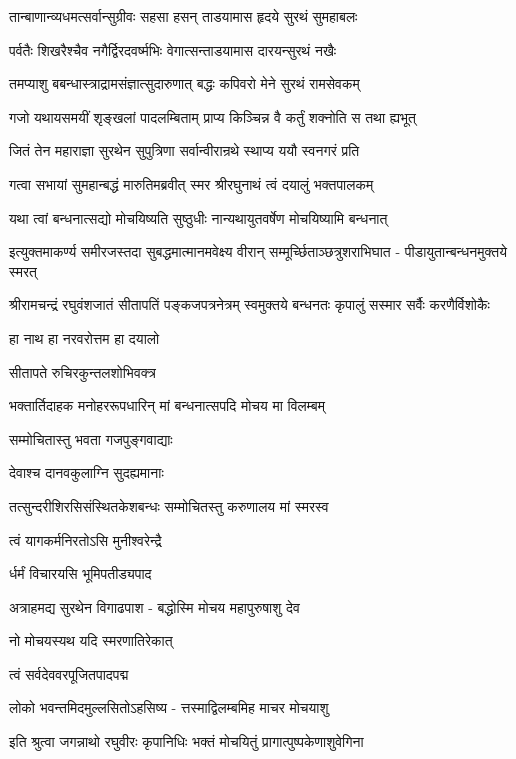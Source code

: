 \twolineshloka
{तान्बाणान्व्यधमत्सर्वान्सुग्रीवः सहसा हसन्}
{ताडयामास हृदये सुरथं सुमहाबलः}%

\twolineshloka
{पर्वतैः शिखरैश्चैव नगैर्द्विरदवर्ष्मभिः}
{वेगात्सन्ताडयामास दारयन्सुरथं नखैः}%

\twolineshloka
{तमप्याशु बबन्धास्त्राद्रामसंज्ञात्सुदारुणात्}
{बद्धः कपिवरो मेने सुरथं रामसेवकम्}%

\twolineshloka
{गजो यथायसमयीं शृङ्खलां पादलम्बिताम्}
{प्राप्य किञ्चिन्न वै कर्तुं शक्नोति स तथा ह्यभूत्}%

\twolineshloka
{जितं तेन महाराज्ञा सुरथेन सुपुत्रिणा}
{सर्वान्वीरान्रथे स्थाप्य ययौ स्वनगरं प्रति}%

\twolineshloka
{गत्वा सभायां सुमहान्बद्धं मारुतिमब्रवीत्}
{स्मर श्रीरघुनाथं त्वं दयालुं भक्तपालकम्}%

\twolineshloka
{यथा त्वां बन्धनात्सद्यो मोचयिष्यति सुष्ठुधीः}
{नान्यथायुतवर्षेण मोचयिष्यामि बन्धनात्}%

\fourlineindentedshloka
{इत्युक्तमाकर्ण्य समीरजस्तदा}
{सुबद्धमात्मानमवेक्ष्य वीरान्}
{सम्मूर्च्छिताञ्छत्रुशराभिघात -}
{पीडायुतान्बन्धनमुक्तये स्मरत्}%

\twolineshloka
{श्रीरामचन्द्रं रघुवंशजातं सीतापतिं पङ्कजपत्रनेत्रम्}
{स्वमुक्तये बन्धनतः कृपालुं सस्मार सर्वैः करणैर्विशोकैः}%


हा नाथ हा नरवरोत्तम हा दयालो

सीतापते रुचिरकुन्तलशोभिवक्त्र

\twolineshloka
{भक्तार्तिदाहक मनोहररूपधारिन्}
{मां बन्धनात्सपदि मोचय मा विलम्बम्}%

सम्मोचितास्तु भवता गजपुङ्गवाद्याः

देवाश्च दानवकुलाग्नि सुदह्यमानाः

\twolineshloka
{तत्सुन्दरीशिरसिसंस्थितकेशबन्धः}
{सम्मोचितस्तु करुणालय मां स्मरस्व}%

त्वं यागकर्मनिरतोऽसि मुनीश्वरेन्द्रै

र्धर्मं विचारयसि भूमिपतीड्यपाद

\twolineshloka
{अत्राहमद्य सुरथेन विगाढपाश -}
{बद्धोस्मि मोचय महापुरुषाशु देव}%

नो मोचयस्यथ यदि स्मरणातिरेकात्

त्वं सर्वदेववरपूजितपादपद्म

\twolineshloka
{लोको भवन्तमिदमुल्लसितोऽहसिष्य -}
{त्तस्माद्विलम्बमिह माचर मोचयाशु}%

\twolineshloka
{इति श्रुत्वा जगन्नाथो रघुवीरः कृपानिधिः}
{भक्तं मोचयितुं प्रागात्पुष्पकेणाशुवेगिना}%

